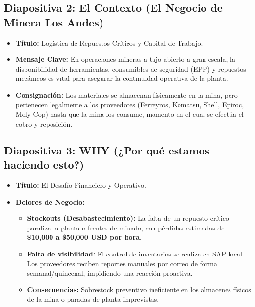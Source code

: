 \documentclass[11pt,a4paper]{article}
\begin{document}
\subsection{Diapositiva 2: El Contexto (El Negocio de Minera Los Andes)}
\begin{itemize}[label=$\bullet$]
    \item \textbf{Título:} Logística de Repuestos Críticos y Capital de Trabajo.
    \item \textbf{Mensaje Clave:} En operaciones mineras a tajo abierto a gran escala, la disponibilidad de herramientas, consumibles de seguridad (EPP) y repuestos mecánicos es vital para asegurar la continuidad operativa de la planta.
    \item \textbf{Consignación:} Los materiales se almacenan físicamente en la mina, pero pertenecen legalmente a los proveedores (Ferreyros, Komatsu, Shell, Epiroc, Moly-Cop) hasta que la mina los consume, momento en el cual se efectúa el cobro y reposición.
\end{itemize}

\subsection{Diapositiva 3: WHY (¿Por qué estamos haciendo esto?)}
\begin{itemize}[label=$\bullet$]
    \item \textbf{Título:} El Desafío Financiero y Operativo.
    \item \textbf{Dolores de Negocio:}
    \begin{itemize}[label=--]
        \item \textbf{Stockouts (Desabastecimiento):} La falta de un repuesto crítico paraliza la planta o frentes de minado, con pérdidas estimadas de \textbf{\$10,000 a \$50,000 USD por hora}.
        \item \textbf{Falta de visibilidad:} El control de inventarios se realiza en SAP local. Los proveedores reciben reportes manuales por correo de forma semanal/quincenal, impidiendo una reacción proactiva.
        \item \textbf{Consecuencias:} Sobrestock preventivo ineficiente en los almacenes físicos de la mina o paradas de planta imprevistas.
    \end{itemize}
\end{itemize}
\end{document}
